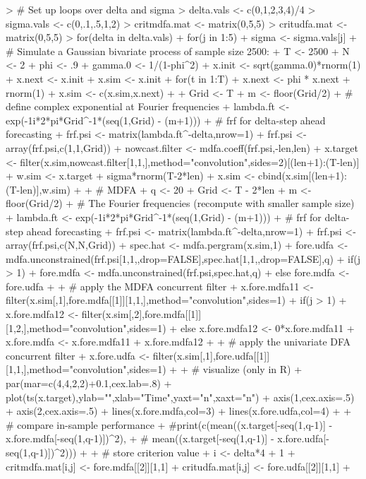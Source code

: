 \documentclass[a4paper]{book}
\begin{document}
\begin{Schunk}
\begin{Sinput}
> # Set up loops over delta and sigma
> delta.vals <- c(0,1,2,3,4)/4
> sigma.vals <- c(0,.1,.5,1,2)
> critmdfa.mat <- matrix(0,5,5)
> critudfa.mat <- matrix(0,5,5)
> for(delta in delta.vals) {
+ for(j in 1:5) {
+ sigma <- sigma.vals[j]
+ # Simulate a Gaussian bivariate process of sample size 2500:
+ T <- 2500
+ N <- 2
+ phi <- .9
+ gamma.0 <- 1/(1-phi^2)
+ x.init <- sqrt(gamma.0)*rnorm(1)
+ x.next <- x.init
+ x.sim <- x.init
+ for(t in 1:T) {
+ 	x.next <- phi * x.next + rnorm(1)
+ 	x.sim <- c(x.sim,x.next) }
+ 
+ Grid <- T
+ m <- floor(Grid/2)
+ # define complex exponential at Fourier frequencies
+ lambda.ft <- exp(-1i*2*pi*Grid^{-1}*(seq(1,Grid) - (m+1)))
+ # frf for delta-step ahead forecasting
+ frf.psi <- matrix(lambda.ft^{-delta},nrow=1) 
+ frf.psi <- array(frf.psi,c(1,1,Grid))
+ nowcast.filter <- mdfa.coeff(frf.psi,-len,len)
+ x.target <- filter(x.sim,nowcast.filter[1,1,],method="convolution",sides=2)[(len+1):(T-len)]
+ w.sim <- x.target + sigma*rnorm(T-2*len)
+ x.sim <- cbind(x.sim[(len+1):(T-len)],w.sim)
+ 
+ # MDFA
+ q <- 20
+ Grid <- T - 2*len
+ m <- floor(Grid/2)
+ # The Fourier frequencies (recompute with smaller sample size)
+ lambda.ft <- exp(-1i*2*pi*Grid^{-1}*(seq(1,Grid) - (m+1)))
+ # frf for delta-step ahead forecasting
+ frf.psi <- matrix(lambda.ft^{-delta},nrow=1) %
+ frf.psi <- array(frf.psi,c(N,N,Grid))
+ spec.hat <- mdfa.pergram(x.sim,1)	
+ fore.udfa <- mdfa.unconstrained(frf.psi[1,1,,drop=FALSE],spec.hat[1,1,,drop=FALSE],q)
+ if(j > 1) { 
+   fore.mdfa <- mdfa.unconstrained(frf.psi,spec.hat,q) 
+ } else { fore.mdfa <- fore.udfa }
+   
+ # apply the MDFA concurrent filter
+ x.fore.mdfa11 <- filter(x.sim[,1],fore.mdfa[[1]][1,1,],method="convolution",sides=1)
+ if(j > 1) { 
+ 	x.fore.mdfa12 <- filter(x.sim[,2],fore.mdfa[[1]][1,2,],method="convolution",sides=1) 
+ } else { x.fore.mdfa12 <- 0*x.fore.mdfa11 }
+ x.fore.mdfa <- x.fore.mdfa11 + x.fore.mdfa12 
+ 
+ # apply the univariate DFA concurrent filter
+ x.fore.udfa <- filter(x.sim[,1],fore.udfa[[1]][1,1,],method="convolution",sides=1)
+  
+ # visualize (only in R)
+ par(mar=c(4,4,2,2)+0.1,cex.lab=.8)
+ plot(ts(x.target),ylab="",xlab="Time",yaxt="n",xaxt="n")
+ axis(1,cex.axis=.5)
+ axis(2,cex.axis=.5)
+ lines(x.fore.mdfa,col=3)
+ lines(x.fore.udfa,col=4)
+ 
+ # compare in-sample performance
+ #print(c(mean((x.target[-seq(1,q-1)] - x.fore.mdfa[-seq(1,q-1)])^2),
+ #	mean((x.target[-seq(1,q-1)] - x.fore.udfa[-seq(1,q-1)])^2)))
+ 
+ # store criterion value
+ i <- delta*4 + 1
+ critmdfa.mat[i,j] <- fore.mdfa[[2]][1,1]
+ critudfa.mat[i,j] <- fore.udfa[[2]][1,1]
+ }}
\end{Sinput}
\end{Schunk}
\end{document}
